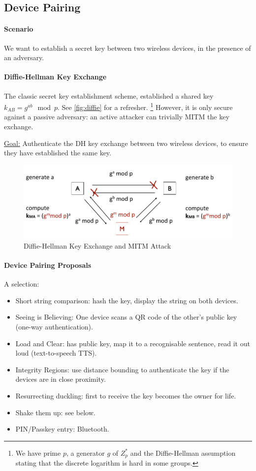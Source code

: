 \subsection{Device Pairing}

\paragraph{Scenario}
We want to establish a secret key between two wireless devices, in the presence of an adversary.

\paragraph{Diffie-Hellman Key Exchange}
The classic secret key establishment scheme, established a shared key $k_{AB} = g^{ab} \mod p$.
See \autoref{fig:diffie} for a refresher.%
\footnote{We have prime $p$, a generator $g$ of $Z^*_p$ and the Diffie-Hellman assumption stating that the discrete logarithm is hard in some groups.}
However, it is only secure against a passive adversary:
an active attacker can trivially MITM the key exchange.

\underline{Goal:} Authenticate the DH key exchange between two wireless devices, to ensure they have established the same key.

\begin{figure}
	\centering
	\includegraphics[scale=0.45]{images/8-diffie.png}
	\caption{Diffie-Hellman Key Exchange and MITM Attack}
	\label{fig:diffie}
\end{figure}

\paragraph{Device Pairing Proposals}
A selection:
\begin{itemize}
	\item Short string comparison: hash the key, display the string on both devices.
	\item Seeing is Believing: One device scans a QR code of the other's public key (one-way authentication).
	\item Load and Clear: has public key, map it to a recognisable sentence, read it out loud (text-to-speech TTS).
	\item Integrity Regions: use distance bounding to authenticate the key if the devices are in close proximity.
	\item Resurrecting duckling: first to receive the key becomes the owner for life.
	\item Shake them up: see below.
	\item PIN/Passkey entry: Bluetooth.
\end{itemize}

